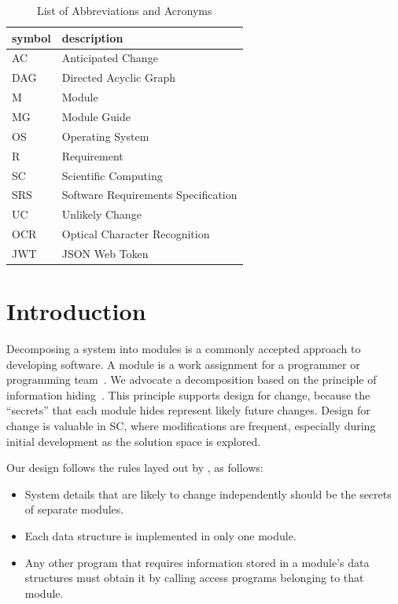 \documentclass[12pt, titlepage]{article}
\begin{document}
\renewcommand{\arraystretch}{1.2}
\begin{table}[H]
\caption{List of Abbreviations and Acronyms}
\centering
\begin{tabularx}{\textwidth}{l X} 
	\toprule		
	\textbf{symbol} & \textbf{description}\\
	\midrule 
	AC & Anticipated Change\\
	DAG & Directed Acyclic Graph \\
	M & Module \\
	MG & Module Guide \\
	OS & Operating System \\
	R & Requirement\\
	SC & Scientific Computing \\
	SRS & Software Requirements Specification\\
	UC & Unlikely Change \\
	OCR & Optical Character Recognition \\
	JWT & JSON Web Token \\
	\bottomrule
\end{tabularx}
\end{table}

\newpage

\tableofcontents

\listoftables

\listoffigures

\newpage


\section{Introduction}

Decomposing a system into modules is a commonly accepted approach to developing
software.  A module is a work assignment for a programmer or programming
team~\citep{ParnasEtAl1984}.  We advocate a decomposition
based on the principle of information hiding~\citep{Parnas1972a}.  This
principle supports design for change, because the ``secrets'' that each module
hides represent likely future changes.  Design for change is valuable in SC,
where modifications are frequent, especially during initial development as the
solution space is explored.  

Our design follows the rules layed out by \citet{ParnasEtAl1984}, as follows:
\begin{itemize}
\item System details that are likely to change independently should be the
  secrets of separate modules.
\item Each data structure is implemented in only one module.
\item Any other program that requires information stored in a module's data
  structures must obtain it by calling access programs belonging to that module.
\end{itemize}
\end{document}
